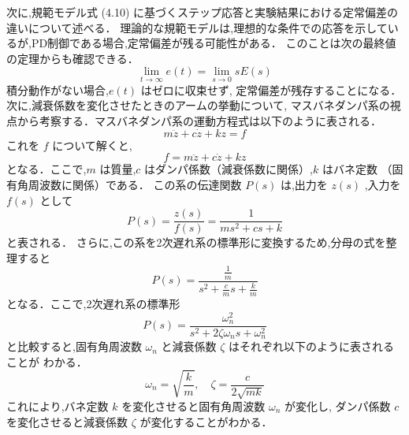 次に,規範モデル式 (4.10) に基づくステップ応答と実験結果における定常偏差の違いについて述べる．
理論的な規範モデルは,理想的な条件での応答を示しているが,PD制御である場合,定常偏差が残る可能性がある．
このことは次の最終値の定理からも確認できる．
\[
  \lim_{t \to \infty} e(t) = \lim_{s \to 0} s E(s)
\]
積分動作がない場合,\( e(t) \) はゼロに収束せず,
定常偏差が残存することになる．
次に,減衰係数を変化させたときのアームの挙動について,
マスバネダンパ系の視点から考察する．マスバネダンパ系の運動方程式は以下のように表される．
\[
  m \ddot{z} + c \dot{z} + k z = f
\]
これを \( f \) について解くと,
\[
  f = m \ddot{z} + c \dot{z} + k z
\]
となる．ここで,\( m \) は質量,\( c \) はダンパ係数（減衰係数に関係）,\( k \) はバネ定数
（固有角周波数に関係）である．
この系の伝達関数 \( P(s) \) は,出力を \( z(s) \) ,入力を \( f(s) \) として
\[
  P(s) = \frac{z(s)}{f(s)} = \frac{1}{m s^2 + c s + k}
\]
と表される．
さらに,この系を2次遅れ系の標準形に変換するため,分母の式を整理すると
\[
  P(s) = \frac{\frac{1}{m}}{s^2 + \frac{c}{m} s + \frac{k}{m}}
\]
となる．ここで,2次遅れ系の標準形
\[
  P(s) = \frac{\omega_n^2}{s^2 + 2 \zeta \omega_n s + \omega_n^2}
\]
と比較すると,固有角周波数 \( \omega_n \) と減衰係数 \( \zeta \) はそれぞれ以下のように表されることが
わかる．
\[
  \omega_n = \sqrt{\frac{k}{m}}, \quad \zeta = \frac{c}{2 \sqrt{m k}}
\]
これにより,バネ定数 \( k \) を変化させると固有角周波数 \( \omega_n \) が変化し,
ダンパ係数 \( c \) を変化させると減衰係数 \( \zeta \) が変化することがわかる．


